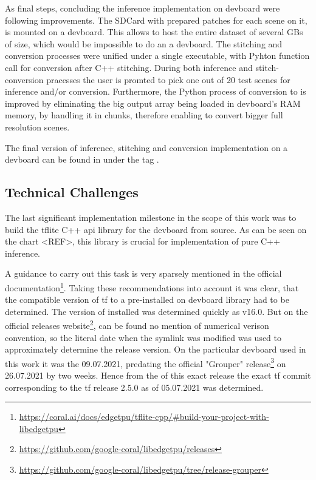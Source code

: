 {As final steps, concluding the inference implementation on \gls{devboard} were following improvements.
The SDCard with prepared  patches for each scene on it, is mounted on a \gls{devboard}. This allows to host the entire dataset of several GBs of size,
which would be impossible to do an a \gls{devboard}.
The stitching and conversion processes were unified under a single executable, with Pyhton function call for conversion after C++  stitching.
During both inference and stitch-conversion pracesses the user is promted to pick one out of 20 test scenes for inference and/or conversion.
Furthermore, the Python process of conversion to  is improved by eliminating the big output array being loaded in \gls{devboard}'s RAM memory,
by handling it in chunks, therefore enabling to convert bigger full resolution scenes.

The final version of inference, stitching and conversion implementation on a \gls{devboard} can be found in  under the tag .

\subsection*{Technical Challenges}
\label{subsec:tecchallDeployment}

The last significant implementation milestone in the scope of this work was to build the \gls{tflite} C++ \gls{api} library for the \gls{devboard} from source.
As can be seen on the chart <REF>, this library is crucial for implementation of pure C++ inference.

A guidance to carry out this task is very sparsely mentioned in the official documentation\footnote{\url{https://coral.ai/docs/edgetpu/tflite-cpp/\#build-your-project-with-libedgetpu}}.
Taking these recommendations into account it was clear, that the compatible version of \gls{tf} to a pre-installed on \gls{devboard}  library had to be determined.
The version of installed  was determined quickly as v16.0. But on the official releases website\footnote{\url{https://github.com/google-coral/libedgetpu/releases}},
can be found no mention of numerical verison convention, so the literal date when the symlink  was modified was used to approximately determine the release version.
On the particular \gls{devboard} used in this work it was the 09.07.2021,
predating the official "Grouper"  release\footnote{\url{https://github.com/google-coral/libedgetpu/tree/release-grouper}} on 26.07.2021 by two weeks.
Hence from the  of this exact release the exact \gls{tf} commit corresponding to the \gls{tf} release 2.5.0 as of 05.07.2021 was determined.

}
